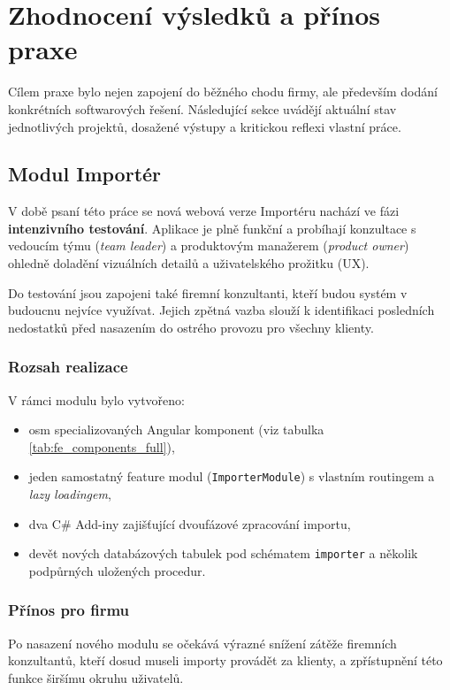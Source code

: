 \chapter{Zhodnocení výsledků a přínos praxe}
\label{chap:evaluation}

Cílem praxe bylo nejen zapojení do běžného chodu firmy, ale především dodání konkrétních softwarových řešení. Následující sekce uvádějí aktuální stav jednotlivých projektů, dosažené výstupy a kritickou reflexi vlastní práce.

\section{Modul Importér}
V době psaní této práce se nová webová verze Importéru nachází ve fázi \textbf{intenzivního testování}. Aplikace je plně funkční a probíhají konzultace s vedoucím týmu (\textit{team leader}) a produktovým manažerem (\textit{product owner}) ohledně doladění vizuálních detailů a uživatelského prožitku (UX).

Do testování jsou zapojeni také firemní konzultanti, kteří budou systém v budoucnu nejvíce využívat. Jejich zpětná vazba slouží k identifikaci posledních nedostatků před nasazením do ostrého provozu pro všechny klienty.

\subsection{Rozsah realizace}
V rámci modulu bylo vytvořeno:
\begin{itemize}
    \item osm specializovaných Angular komponent (viz tabulka \ref{tab:fe_components_full}),
    \item jeden samostatný feature modul (\texttt{ImporterModule}) s vlastním routingem a \textit{lazy loadingem},
    \item dva C\# Add-iny zajišťující dvoufázové zpracování importu,
    \item devět nových databázových tabulek pod schématem \texttt{importer} a několik podpůrných uložených procedur.
\end{itemize}

\subsection{Přínos pro firmu}
Po nasazení nového modulu se očekává výrazné snížení zátěže firemních konzultantů, kteří dosud museli importy provádět za klienty, a zpřístupnění této funkce širšímu okruhu uživatelů.


